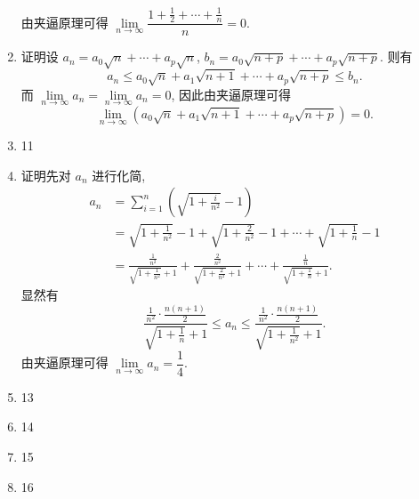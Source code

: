 \begin{enumerate}
        由夹逼原理可得 $\lim\limits_{n\to\infty}\dfrac{1 + \frac 12 + \cdots + \frac 1n}{n} = 0$.
    \item %
        {\heiti 证明}\quad 设 $a_n = a_0\sqrt{n} + \cdots + a_p\sqrt{n}$, $b_n = a_0\sqrt{n + p} + \cdots + a_p\sqrt{n + p}$. 则有
        \[
            a_n \leqslant a_0\sqrt{n} + a_1\sqrt{n + 1} + \cdots + a_p\sqrt{n + p} \leqslant b_n.
        \]
        而 $\lim\limits_{n\to\infty}a_n = \lim\limits_{n\to\infty}a_n = 0$, 因此由夹逼原理可得
        \[
            \lim\limits_{n\to\infty}(a_0\sqrt{n} + a_1\sqrt{n + 1} + \cdots + a_p\sqrt{n + p}) = 0.    
        \]
    \item 11
    \item %
        {\heiti 证明}\quad 先对 $a_n$ 进行化简,
        \begin{align*}
            a_n &= \sum_{i=1}^n\left( \sqrt{1 + \frac{i}{n^2}} - 1 \right) \\
            &= \sqrt{1 + \frac{1}{n^2}} - 1 + \sqrt{1 + \frac{2}{n^2}} - 1 + \cdots + \sqrt{1 + \frac{1}{n}} - 1 \\
            &= \frac{\frac{1}{n^2}}{\sqrt{1 + \frac{1}{n^2}} + 1} + \frac{\frac{2}{n^2}}{\sqrt{1 + \frac{2}{n^2}} + 1} + \cdots + \frac{\frac{1}{n}}{\sqrt{1 + \frac{1}{n}} + 1}.
        \end{align*}
        显然有
        \begin{equation*}
            \frac{\frac{1}{n^2} \cdot \frac{n(n+1)}{2}}{\sqrt{1 + \frac{1}{n}} + 1} \leqslant a_n \leqslant \frac{\frac{1}{n^2} \cdot \frac{n(n+1)}{2}}{\sqrt{1 + \frac{1}{n^2}} + 1}.
        \end{equation*}
        由夹逼原理可得 $\lim\limits_{n\to\infty}a_n = \dfrac 14$.
    \item 13
    \item 14
    \item 15
    \item 16
\end{enumerate}

% 
